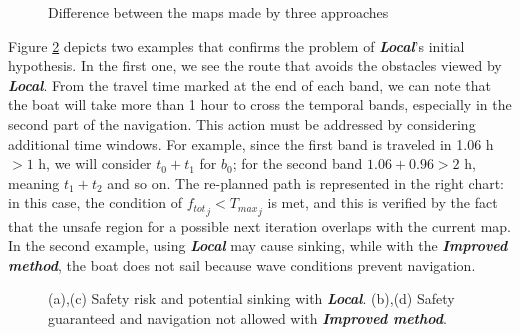 \begin{figure}[H]
	\centering 
	\hspace{0.1cm}
	\hspace{0.1cm}
	\vspace{0.0cm}
	\caption{Difference between the maps made by three approaches} 
	\label{compsumlocimpr}
\end{figure}
\newpage
Figure \ref{localproblem} depicts two examples that confirms the problem of \textbf{\textit{Local}}'s initial hypothesis. In the first one, we see the route that avoids the obstacles viewed by \textbf{\textit{Local}}. From the travel time marked at the end of each band, we can note that the boat will take more than 1 hour to cross the temporal bands, especially in the second part of the navigation. This action must be addressed by considering additional time windows. For example, since the first band is traveled in 1.06 h $> 1$ h, we will consider $t_0+t_1$ for $b_0$; for the second band $1.06+0.96>2$ h, meaning $t_1+t_2$ and so on. The re-planned path is represented in the right chart: in this case, the condition of ${f_{tot}}_j< {T_{max}}_j$ is met, and this is verified by the fact that the unsafe region for a possible next iteration overlaps with the current map. \\ 
In the second example, using \textbf{\textit{Local}} may cause sinking, while with the \textbf{\textit{Improved method}}, the boat does not sail because wave conditions prevent navigation.  

\begin{figure}[H]
	\centering 
	\captionsetup{font=footnotesize,labelfont=footnotesize}
	\hspace{0.5cm}
	\hspace{0.5cm}
	\hspace{0.5cm}
	\vspace{0.0cm}
	\caption{(a),(c) Safety risk and potential sinking with \textbf{\textit{Local}}. (b),(d) Safety guaranteed and navigation not allowed with \textbf{\textit{Improved method}}.}
	\label{localproblem}
\end{figure}
